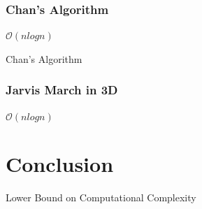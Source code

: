 \documentclass{beamer}
\begin{document}
    
    \begin{frame}
      \frametitle{Chan's Algorithm}
      
      \begin{center}
        $\mathcal{O}(n log n)$
      \end{center}
    \end{frame}
    
    \begin{frame}{Chan's Algorithm}
      \end{frame}
      
      
      \begin{frame}
        \frametitle{Jarvis March in 3D}
        
        \begin{center}
          
          $\mathcal{O}(n log n)$
        \end{center}
      \end{frame}
      
      \section{Conclusion}
      \begin{frame}{Lower Bound on Computational Complexity}
          
      \end{frame}
      
      
        
          
          
 
    

\end{document}
